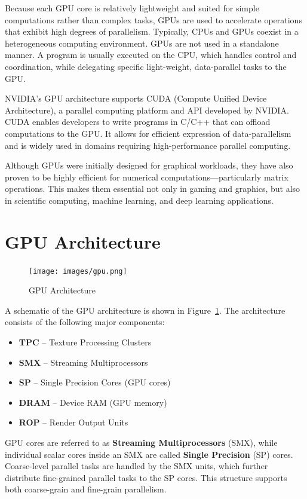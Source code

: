 \documentclass[12pt]{book}
\begin{document}
Because each GPU core is relatively lightweight and suited for simple computations rather than complex tasks, GPUs are used to accelerate operations that exhibit high degrees of parallelism. Typically, CPUs and GPUs coexist in a heterogeneous computing environment. GPUs are not used in a standalone manner. A program is usually executed on the CPU, which handles control and coordination, while delegating specific light-weight, data-parallel tasks to the GPU.

NVIDIA's GPU architecture supports CUDA (Compute Unified Device Architecture), a parallel computing platform and API developed by NVIDIA. CUDA enables developers to write programs in C/C++ that can offload computations to the GPU. It allows for efficient expression of data-parallelism and is widely used in domains requiring high-performance parallel computing.

Although GPUs were initially designed for graphical workloads, they have also proven to be highly efficient for numerical computations—particularly matrix operations. This makes them essential not only in gaming and graphics, but also in scientific computing, machine learning, and deep learning applications.


\section{GPU Architecture}

\begin{figure}[H]
    \centering
    \texttt{[image: images/gpu.png]}
    \caption{GPU Architecture}
    \label{fig:gpu}
\end{figure}

A schematic of the GPU architecture is shown in Figure~\ref{fig:gpu}. The architecture consists of the following major components:
\begin{itemize}
    \item \textbf{TPC} – Texture Processing Clusters
    \item \textbf{SMX} – Streaming Multiprocessors
    \item \textbf{SP} – Single Precision Cores (GPU cores)
    \item \textbf{DRAM} – Device RAM (GPU memory)
    \item \textbf{ROP} – Render Output Units
\end{itemize}

GPU cores are referred to as \textbf{Streaming Multiprocessors} (SMX), while individual scalar cores inside an SMX are called \textbf{Single Precision} (SP) cores. Coarse-level parallel tasks are handled by the SMX units, which further distribute fine-grained parallel tasks to the SP cores. This structure supports both coarse-grain and fine-grain parallelism.
\end{document}
